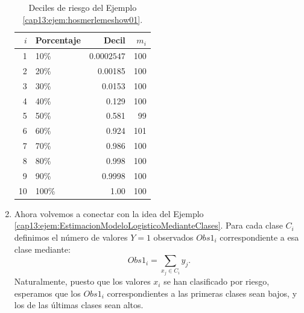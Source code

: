 \begin{enumerate}
\begin{ejemplo}
        \begin{table}[htbp]
            \begin{center}
            \begin{tabular}{rlrr}
              \hline
             $i$ & Porcentaje & Decil & $m_i$ \\
              \hline
               1 & 10\% & $0.0002547$& 100 \\
               2 &  20\% & 0.00185& 100 \\
               3 &  30\% & 0.0153& 100 \\
               4 &  40\% & 0.129& 100 \\
               5 & 50\% & 0.581& 99 \\
               6 & 60\% & 0.924& 101 \\
               7 & 70\% & 0.986& 100 \\
               8 & 80\% & 0.998& 100 \\
               9 &  90\% & 0.9998& 100 \\
               10&  100\% & 1.00& 100 \\
               \hline
            \end{tabular}
            \end{center}
        	\caption{Deciles de riesgo del Ejemplo \ref{cap13:ejem:hosmerlemeshow01}.}
            \label{cap13:tabla:hosmerlemeshow01}
        \end{table}
    \end{ejemplo}

\item Ahora volvemos a conectar con la idea del Ejemplo \ref{cap13:ejem:EstimacionModeloLogisticoMedianteClases}. Para cada clase $C_i$ definimos el número de valores $Y=1$ observados $Obs1_i$ correspondiente a esa clase mediante:
    \begin{equation}
    \label{cap13:ecu:Obs1HosmerLemeshow}
    Obs1_i = \displaystyle\sum_{x_j\in C_i} y_j.
    \end{equation}
    Naturalmente, puesto que los valores $x_i$ se han clasificado por riesgo, esperamos que los $Obs1_i$ correspondientes a las primeras clases sean bajos, y los de las últimas clases sean altos.


\end{enumerate}

